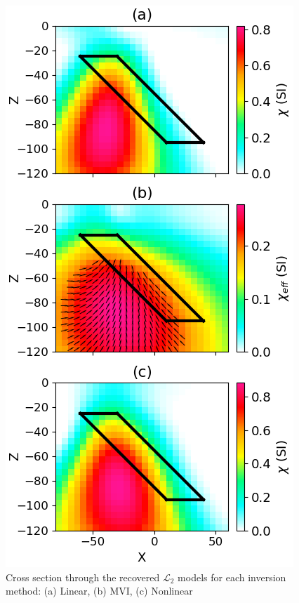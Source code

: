 \begin{figure}[htb]
    \vspace{-0.1cm}
    \begin{center}
    \includegraphics[width=\columnwidth]{figures/L2.png}
    \end{center}
    \vspace{-0.5cm}
\caption{
    Cross section through the recovered $\mathcal{L}_2$ models for each inversion method: (a) Linear, (b) MVI, (c) Nonlinear
}
\label{fig:L2}
\vspace{-0.1cm}
\end{figure}
